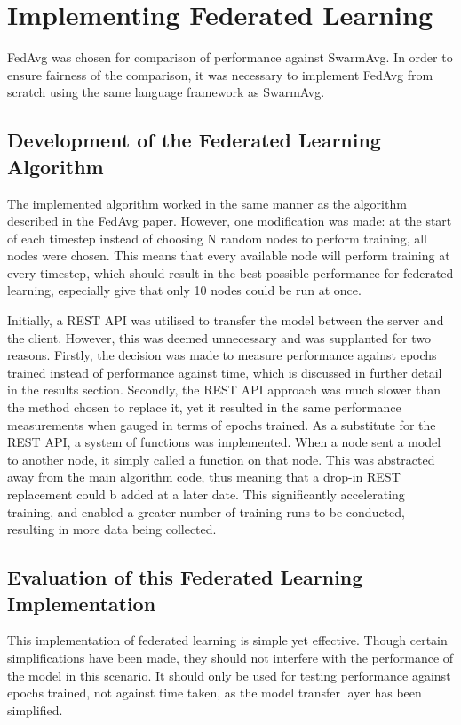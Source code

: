 \section{Implementing Federated Learning}
FedAvg was chosen for comparison of performance against SwarmAvg. In order to ensure fairness of the comparison, it was necessary to implement FedAvg from scratch using the same language framework as SwarmAvg.
\subsection{Development of the Federated Learning Algorithm}
The implemented algorithm worked in the same manner as the algorithm described in the FedAvg paper. However, one modification was made: at the start of each timestep instead of choosing N random nodes to perform training, all nodes were chosen. This means that every available node will perform training at every timestep, which should result in the best possible performance for federated learning, especially give that only 10 nodes could be run at once.

Initially, a REST API was utilised to transfer the model between the server and the client. However, this was deemed unnecessary and was supplanted for two reasons. Firstly, the decision was made to measure performance against epochs trained instead of performance against time, which is discussed in further detail in the results section. Secondly, the REST API approach was much slower than the method chosen to replace it, yet it resulted in the same performance measurements when gauged in terms of epochs trained. As a substitute for the REST API, a system of functions was implemented. When a node sent a model to another node, it simply called a function on that node. This was abstracted away from the main algorithm code, thus meaning that a drop-in REST replacement could b added at a later date. This significantly accelerating training, and enabled a greater number of training runs to be conducted, resulting in more data being collected.

\subsection{Evaluation of this Federated Learning Implementation}
This implementation of federated learning is simple yet effective. Though certain simplifications have been made, they should not interfere with the performance of the model in this scenario. It should only be used for testing performance against epochs trained, not against time taken, as the model transfer layer has been simplified.

